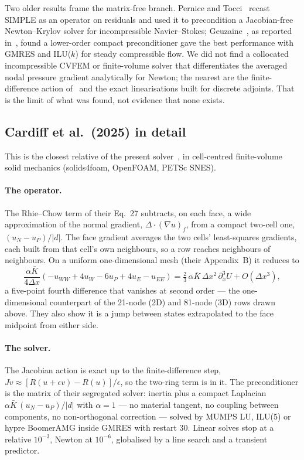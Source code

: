 \documentclass[11pt,a4paper]{article}
\begin{document}
Two older results frame the matrix-free branch. Pernice and Tocci~\cite{pernice01} recast SIMPLE
as an operator on residuals and used it to precondition a Jacobian-free Newton--Krylov solver for
incompressible Navier--Stokes; Geuzaine~\cite{geuzaine01}, as reported in~\cite{cardiff25}, found
a lower-order compact preconditioner gave the best performance with GMRES and ILU($k$) for steady
compressible flow. We did not find a collocated incompressible CVFEM or finite-volume solver that
differentiates the averaged nodal pressure gradient analytically for Newton; the nearest are the
finite-difference action of~\cite{cardiff25} and the exact linearisations built for discrete
adjoints. That is the limit of what was found, not evidence that none exists.

\subsection{Cardiff et al.\ (2025) in detail}

This is the closest relative of the present solver~\cite{cardiff25}, in cell-centred finite-volume
solid mechanics (solids4foam, OpenFOAM, PETSc SNES).

\paragraph{The operator.} The Rhie--Chow term of their Eq.~27 subtracts, on each face, a wide
approximation of the normal gradient, $\Delta\cdot(\nabla u)_f$, from a compact two-cell one,
$(u_N-u_P)/|d|$. The face gradient averages the two cells' least-squares gradients, each built from
that cell's own neighbours, so a row reaches neighbours of neighbours. On a uniform
one-dimensional mesh (their Appendix~B) it reduces to
\[
\frac{\alpha\bar K}{4\Delta x}\left(-u_{WW} + 4u_W - 6u_P + 4u_E - u_{EE}\right)
= \tfrac23\,\alpha\bar K\,\Delta x^2\, \partial_x^3 U + O(\Delta x^3),
\]
a five-point fourth difference that vanishes at second order --- the one-dimensional counterpart of
the 21-node (2D) and 81-node (3D) rows drawn above. They also show it is a jump between states
extrapolated to the face midpoint from either side.

\paragraph{The solver.} The Jacobian action is exact up to the finite-difference step,
$Jv \approx [R(u+\epsilon v)-R(u)]/\epsilon$, so the two-ring term is in it. The preconditioner is
the matrix of their segregated solver: inertia plus a compact Laplacian
$\alpha\bar K\,(u_N-u_P)/|d|$ with $\alpha=1$ --- no material tangent, no coupling between
components, no non-orthogonal correction --- solved by MUMPS LU, ILU(5) or hypre BoomerAMG inside
GMRES with restart 30. Linear solves stop at a relative $10^{-3}$, Newton at $10^{-6}$, globalised
by a line search and a transient predictor.
\end{document}

